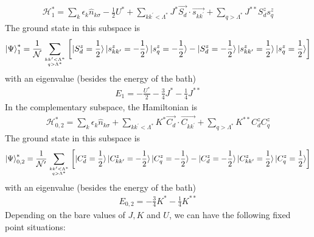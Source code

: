 \documentclass[twoside,11pt]{report}
\numberwithin{equation}{section}
\begin{document}
\begin{equation}\begin{aligned}
	\mathcal{H}^*_{1} = \sum_k \epsilon_k \hat n_{k\sigma} - \frac{1}{2} U^* + \sum_{kk^\prime < \Lambda^*}J^* \vec{S_d}\cdot\vec{s_{kk^\prime}}+ \sum_{q > \Lambda^*}J^{**} S_d^z s^z_{q}
\end{aligned}\end{equation}
The ground state in this subspace is
\begin{equation}\begin{aligned}
	\ket{\Psi}^*_{1}= \frac{1}{\mathcal{N}}\sum_{kk^\prime < \Lambda^*\atop{q>\Lambda^*}}\left[\ket{S_d^z= \frac{1}{2}}\ket{s^z_{kk^\prime}= - \frac{1}{2}}\ket{s^z_{q}= - \frac{1}{2}} - \ket{S_d^z=- \frac{1}{2}}\ket{s^z_{kk^\prime}=  \frac{1}{2}}\ket{s^z_{q}=  \frac{1}{2}}\right]
\end{aligned}\end{equation}
with an eigenvalue (besides the energy of the bath)
\begin{equation}\begin{aligned}
	E_{1} = - \frac{U^*}{2} - \frac{3}{4}J^* - \frac{1}{4}J^{**}
\end{aligned}\end{equation}
In the complementary subspace, the Hamiltonian is
\begin{equation}\begin{aligned}
	\mathcal{H}^*_{0,2} = \sum_k \epsilon_k \hat n_{k\sigma} + \sum_{kk^\prime < \Lambda^*}K^* \vec{C_d}\cdot\vec{C_{kk^\prime}}+ \sum_{q > \Lambda^*}K^{**} C_d^z C^z_{q}
\end{aligned}\end{equation}
The ground state in this subspace is
\begin{equation}\begin{aligned}
	\ket{\Psi}^*_{0,2}= \frac{1}{\mathcal{N^\prime}}\sum_{kk^\prime < \Lambda^*\atop{q>\Lambda^*}}\left[\ket{C_d^z= \frac{1}{2}}\ket{C^z_{kk^\prime}= - \frac{1}{2}}\ket{C^z_{q}= - \frac{1}{2}} - \ket{C_d^z=- \frac{1}{2}}\ket{C^z_{kk^\prime}=  \frac{1}{2}}\ket{C^z_{q}=  \frac{1}{2}}\right]
\end{aligned}\end{equation}
with an eigenvalue (besides the energy of the bath)
\begin{equation}\begin{aligned}
	E_{0,2} = - \frac{3}{4}K^* - \frac{1}{4}K^{**}
\end{aligned}\end{equation}
Depending on the bare values of \(J,K\) and \(U\), we can have the following fixed point situations:
\end{document}
